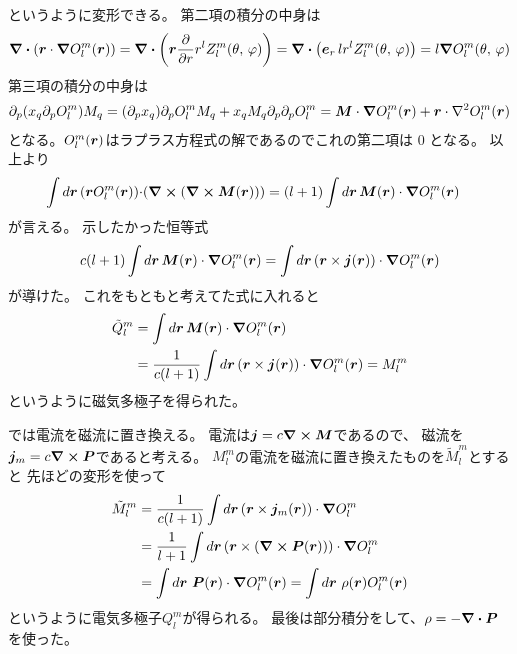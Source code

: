 \documentclass[../../master.tex]{subfiles}
\begin{document}
というように変形できる。
第二項の積分の中身は
\begin{align}
    \div(\vb*{r}\cdot \grad O_l^m(\vb*{r}))
    = \div(\vb*{r}\pdv{r} r^l Z_l^m(\theta,\,\varphi))
    = \div(\vb*{e}_r \, lr^{l} Z_l^m(\theta,\,\varphi))
    = l\grad O_l^m(\theta,\,\varphi)
\end{align}
第三項の積分の中身は
\begin{align}
    \partial_p(x_q\partial_p O_l^m) M_q
    = (\partial_p x_q) \partial_p O_l^m M_q + x_q M_q \partial_p \partial_p O_l^m
    = \vb*{M} \cdot \grad O_l^m(\vb*{r}) + \vb*{r}\cdot \laplacian O_l^m(\vb*{r})
\end{align}
となる。\(O_l^m(\vb*{r})\)はラプラス方程式の解であるのでこれの第二項は 0 となる。
以上より
\begin{align}
    \int d\vb*{r}\, (\vb*{r}O_l^m(\vb*{r}))\cdot&(\curl (\curl\vb*{M}(\vb*{r})))
    = (l+1)\int d\vb*{r}\, \vb*{M}(\vb*{r})\cdot\grad O_l^m(\vb*{r})
\end{align}
が言える。
示したかった恒等式
\begin{equation}
    c(l+1)\int d\vb*{r}\, \vb*{M}(\vb*{r})\cdot\grad O_l^m(\vb*{r})
    =\int d\vb*{r}\, (\vb*{r}\times\vb*{j}(\vb*{r}))\cdot \grad O_l^m(\vb*{r})
\end{equation}
が導けた。
これをもともと考えてた式に入れると
\begin{align}
    \tilde{Q}_l^m &= \int d\vb*{r}\, \vb*{M}(\vb*{r}) \cdot \grad O_l^m(\vb*{r}) \\
    &=\frac{1}{c(l+1)}\int d\vb*{r}\,(\vb*{r}\times \vb*{j}(\vb*{r}))\cdot \grad O_l^m(\vb*{r}) = M_l^m
\end{align}
というように磁気多極子を得られた。

では電流を磁流に置き換える。
電流は\(\vb*{j}=c\curl \vb*{M}\)であるので、
磁流を\(\vb*{j}_m=c\curl \vb*{P}\)であると考える。
\(M_l^m\)の電流を磁流に置き換えたものを\(\tilde{M}_l^m\)とすると
先ほどの変形を使って
\begin{align}
    \tilde{M}_l^m
    &= \frac{1}{c(l+1)}\int d\vb*{r}\, (\vb*{r}\times \vb*{j}_m(\vb*{r}))\cdot\grad O_l^m\\
    &= \frac{1}{l+1}\int d\vb*{r}\, (\vb*{r}\times (\curl \vb*{P}(\vb*{r}))) \cdot\grad O_l^m\\
    &= \int d\vb*{r}\, \,\vb*{P}(\vb*{r}) \cdot \grad O_l^m(\vb*{r})
    = \int d\vb*{r}\, \,\rho(\vb*{r}) O_l^m(\vb*{r})
\end{align}
というように電気多極子\(Q_l^m\)が得られる。
最後は部分積分をして、\(\rho = -\div \vb*{P}\)を使った。
\end{document}
